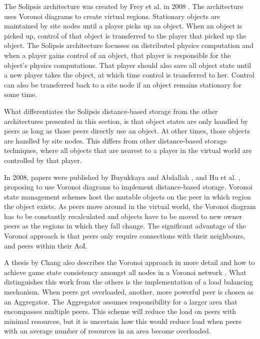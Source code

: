 \documentclass[10pt,a4paper,journal,cspaper,compsoc]{IEEEtran}
\begin{document}
The Solipsis architecture was created by Frey et al. in 2008 \cite{solipsis}. The architecture uses Voronoi diagrams to create virtual regions.
Stationary objects are maintained by site nodes until a player picks up an object. When an object is picked up, control of that object is transferred
to the player that picked up the object. The Solipsis architecture focusses on distributed physics computation and when a player gains control of an
object, that player is responsible for the object's physics computations. That player should also save all object state until a new player takes the
object, at which time control is transferred to her. Control can also be transferred back to a site node if an object remains stationary for some
time.

What differentiates the Solipsis distance-based storage from the other architectures presented in this section, is that object states are only
handled by peers as long as those peers directly use an object. At other times, those objects are handled by site nodes. This differs from other
distance-based storage techniques, where all objects that are nearest to a player in the virtual world are controlled by that player.

In 2008, papers were published by Buyukkaya and Abdallah \cite{Buyukkaya_voronoi_state_management}, and Hu et al. \cite{Hu_voronoi_IM}, proposing to
use Voronoi diagrams \cite{voronoi_diagrams_survey} to implement distance-based storage. Voronoi state management schemes host the mutable objects on
the peer in which region the object exists. As peers move around in the virtual world, the Voronoi diagram has to be constantly recalculated and
objects have to be moved to new owner peers as the regions in which they fall change. The significant advantage of the Voronoi approach is that peers
only require connections with their neighbours, and peers within their AoI.

A thesis by Chang also describes the Voronoi approach in more detail and how to achieve game state consistency amongst all nodes in a Voronoi network
\cite{Chang_Voronoi_state_management_masters}. What distinguishes this work from the others is the implementation of a load balancing mechanism. When
peers get overloaded, another, more powerful peer is chosen as an Aggregator. The Aggregator assumes responsibility for a larger area that
encompasses multiple peers. This scheme will reduce the load on peers with minimal resources, but it is uncertain how this would reduce load when
peers with an average number of resources in an area become overloaded.
\end{document}
